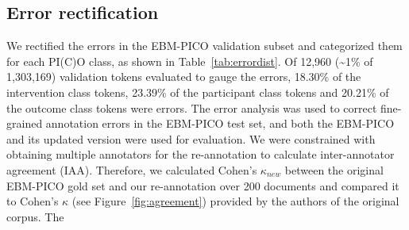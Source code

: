 \documentclass[10.7pt,]{article}
\begin{document}
\subsection{Error rectification}
%
We rectified the errors in the EBM-PICO validation subset and categorized them for each PI(C)O class, as shown in Table~\ref{tab:errordist}.
Of 12,960 (\textasciitilde1\% of 1,303,169) validation tokens evaluated to gauge the errors, 18.30\% of the intervention class tokens, 23.39\% of the participant class tokens and 20.21\% of the outcome class tokens were errors.
The error analysis was used to correct fine-grained annotation errors in the EBM-PICO test set, and both the EBM-PICO and its updated version were used for evaluation.
We were constrained with obtaining multiple annotators for the re-annotation to calculate inter-annotator agreement (IAA).
Therefore, we calculated Cohen's $\kappa_{new}$ between the original EBM-PICO gold set and our re-annotation over 200 documents and compared it to Cohen's $\kappa$ (see Figure~\ref{fig:agreement}) provided by the authors of the original corpus.\cite{nye2018corpus}
The 
\end{document}
